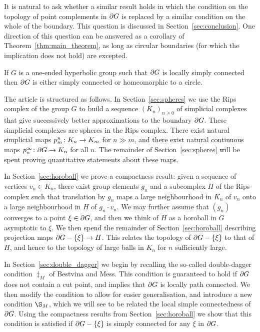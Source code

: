\documentclass[a4paper]{article}
\begin{document}
It is natural to ask whether a similar result holds in which the condition on
the topology of point complements in $\partial G$ is replaced by a similar
condition on the whole of the boundary. This question is discussed in
Section~\ref{sec:conclusion}. One direction of this question can be answered as
a corollary of Theorem~\ref{thm:main_theorem}, as long as circular boundaries
(for which the implication does not hold) are excepted.

\begin{proposition}\label{prop:converse_theorem}
  If $G$ is a one-ended hyperbolic group such that $\partial G$ is locally
  simply connected then $\partial G$ is either simply connected or
  homeomorphic to a circle.
\end{proposition}

The article is structured as follows. In Section~\ref{sec:spheres} we use the
Rips complex of the group $G$ to build a sequence $(K_n)_{n \geq 0}$ of
simplicial complexes that give successively better approximations to the
boundary $\partial G$. These simplicial complexes are spheres in the Rips
complex. There exist natural simplicial maps $p^n_m\colon K_n\to K_m$ for $n \gg
m$, and there exist natural continuous maps $p^\infty_n\colon\partial G \to
K_n$ for all $n$.  The remainder of Section~\ref{sec:spheres} will be spent
proving quantitative statements about these maps.

In Section~\ref{sec:horoball} we prove a compactness result: given a sequence
of vertices $v_n \in K_n$, there exist group elements $g_n$ and a subcomplex
$H$ of the Rips complex such that translation by $g_n$ maps a large
neighbourhood in $K_n$ of $v_n$ onto a large neighbourhood in $H$ of $g_n\cdot
v_n$.  We may further assume that $(g_n)$ converges to a point $\xi \in
\partial G$, and then we think of $H$ as a horoball in $G$ asymptotic to
$\xi$. We then spend the remainder of Section~\ref{sec:horoball} describing
projection maps $\partial G - \left\{\xi\right\} \to H$. This relates the topology of
$\partial G - \left\{\xi\right\}$ to that of $H$, and hence to the topology of large
balls in $K_n$ for $n$ sufficiently large.

In Section~\ref{sec:double_dagger} we begin by recalling the so-called
double-dagger condition $\ddag_M$ of Bestvina and Mess. This condition is
guaranteed to hold if $\partial G$ does not contain a cut point, and implies
that $\partial G$ is locally path connected. We then modify the condition to
allow for easier generalisation, and introduce a new condition $\S_M$, which we
will see to be related the local simple connectedness of $\partial G$. Using
the compactness results from Section~\ref{sec:horoball} we show that this
condition is satisfied if $\partial G - \left\{\xi\right\}$ is simply connected for any
$\xi$ in $\partial G$.
\end{document}
